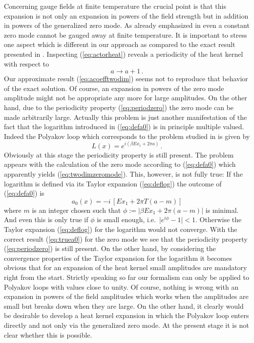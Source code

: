\documentclass[a4paper,showpacs,showkeys,prd,nofootinbib]{revtex4}
\begin{document}
Concerning gauge fields at finite temperature the crucial point is that this expansion 
is not only an 
expansion in powers of the field strength but in addition in powers of the generalized
zero mode. As already emphasized in \cite{Actor:1998cn} even a constant zero mode cannot
be gauged away at finite temperature. It is important to stress one aspect which is
different in our approach as compared to the exact result presented in \cite{Actor:1998cn}.
Inspecting (\ref{eq:actorheat}) reveals a periodicity of the heat kernel with respect
to 
\begin{equation}
  \label{eq:periodzero}
a \to a + 1   \,.
\end{equation}
Our approximate result (\ref{eq:acoefftwodim}) seems not to reproduce that behavior of 
the exact solution. Of course, an expansion in powers of the zero mode amplitude might
not be appropriate any more for large amplitudes. On the other hand, due to the 
periodicity property (\ref{eq:periodzero}) the zero mode can be made arbitrarily large.
Actually this problem is just another manifestation of the fact that the logarithm 
introduced in (\ref{eq:defa0}) is in principle multiple valued. Indeed the Polyakov 
loop which corresponds to the problem studied in \cite{Actor:1998cn} is given by
\begin{equation}
  \label{eq:polyactor}
L(x) = e^{i(\beta E x_1 + 2 \pi a)}   \,.
\end{equation}
Obviously at this stage the periodicity property is still present. The problem appears
with the calculation of the zero mode according to (\ref{eq:defa0}) which apparently
yields (\ref{eq:twodimzeromode}). This, however, is not fully true: If the logarithm
is defined via its Taylor expansion (\ref{eq:deflog}) the outcome of (\ref{eq:defa0}) 
is 
\begin{equation}
  \label{eq:truea0}
a_0(x) = -i \, [E x_1 + 2 \pi T (a-m)] 
\end{equation}
where $m$ is an integer chosen such that $\phi:=\vert \beta E x_1 + 2 \pi (a-m) \vert$
is minimal. And even this is only true if $\phi$ is small enough, 
i.e.~$\vert e^{i\phi}-1 \vert < 1$. 
Otherwise the Taylor expansion (\ref{eq:deflog}) for the logarithm would not converge.
With the correct result (\ref{eq:truea0}) for the zero mode we see that the
periodicity property (\ref{eq:periodzero}) is still present. On the other hand,
by considering the convergence properties of the Taylor expansion for the logarithm 
it becomes obvious 
that for an expansion of the heat kernel small amplitudes are mandatory
right from the start. Strictly speaking so far our formalism can only be applied to
Polyakov loops with values close to unity. Of course, nothing is wrong with an
expansion in powers of the field amplitudes which works when the amplitudes are small
but breaks down when they are large. On the other hand, it clearly would be
desirable to develop a heat
kernel expansion in which the Polyakov loop enters directly and not only via the
generalized zero mode. At the present stage it is not clear whether this is possible.
\end{document}

